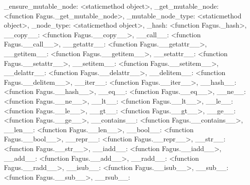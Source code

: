 \documentclass[a4paper,10pt,english]{sphinxmanual}
\begin{document}
\begin{fulllineitems}
\begin{fulllineitems}
\textquotesingle{}\_ensure\_mutable\_node\textquotesingle{}: \textless{}staticmethod object\textgreater{}, \textquotesingle{}\_get\_mutable\_node\textquotesingle{}: \textless{}function Fagus.\_get\_mutable\_node\textgreater{}, \textquotesingle{}\_mutable\_node\_type\textquotesingle{}: \textless{}staticmethod object\textgreater{}, \textquotesingle{}\_node\_type\textquotesingle{}: \textless{}staticmethod object\textgreater{}, \textquotesingle{}\_hash\textquotesingle{}: \textless{}function Fagus.\_hash\textgreater{}, \textquotesingle{}\_\_copy\_\_\textquotesingle{}: \textless{}function Fagus.\_\_copy\_\_\textgreater{}, \textquotesingle{}\_\_call\_\_\textquotesingle{}: \textless{}function Fagus.\_\_call\_\_\textgreater{}, \textquotesingle{}\_\_getattr\_\_\textquotesingle{}: \textless{}function Fagus.\_\_getattr\_\_\textgreater{}, \textquotesingle{}\_\_getitem\_\_\textquotesingle{}: \textless{}function Fagus.\_\_getitem\_\_\textgreater{}, \textquotesingle{}\_\_setattr\_\_\textquotesingle{}: \textless{}function Fagus.\_\_setattr\_\_\textgreater{}, \textquotesingle{}\_\_setitem\_\_\textquotesingle{}: \textless{}function Fagus.\_\_setitem\_\_\textgreater{}, \textquotesingle{}\_\_delattr\_\_\textquotesingle{}: \textless{}function Fagus.\_\_delattr\_\_\textgreater{}, \textquotesingle{}\_\_delitem\_\_\textquotesingle{}: \textless{}function Fagus.\_\_delitem\_\_\textgreater{}, \textquotesingle{}\_\_iter\_\_\textquotesingle{}: \textless{}function Fagus.\_\_iter\_\_\textgreater{}, \textquotesingle{}\_\_hash\_\_\textquotesingle{}: \textless{}function Fagus.\_\_hash\_\_\textgreater{}, \textquotesingle{}\_\_eq\_\_\textquotesingle{}: \textless{}function Fagus.\_\_eq\_\_\textgreater{}, \textquotesingle{}\_\_ne\_\_\textquotesingle{}: \textless{}function Fagus.\_\_ne\_\_\textgreater{}, \textquotesingle{}\_\_lt\_\_\textquotesingle{}: \textless{}function Fagus.\_\_lt\_\_\textgreater{}, \textquotesingle{}\_\_le\_\_\textquotesingle{}: \textless{}function Fagus.\_\_le\_\_\textgreater{}, \textquotesingle{}\_\_gt\_\_\textquotesingle{}: \textless{}function Fagus.\_\_gt\_\_\textgreater{}, \textquotesingle{}\_\_ge\_\_\textquotesingle{}: \textless{}function Fagus.\_\_ge\_\_\textgreater{}, \textquotesingle{}\_\_contains\_\_\textquotesingle{}: \textless{}function Fagus.\_\_contains\_\_\textgreater{}, \textquotesingle{}\_\_len\_\_\textquotesingle{}: \textless{}function Fagus.\_\_len\_\_\textgreater{}, \textquotesingle{}\_\_bool\_\_\textquotesingle{}: \textless{}function Fagus.\_\_bool\_\_\textgreater{}, \textquotesingle{}\_\_repr\_\_\textquotesingle{}: \textless{}function Fagus.\_\_repr\_\_\textgreater{}, \textquotesingle{}\_\_str\_\_\textquotesingle{}: \textless{}function Fagus.\_\_str\_\_\textgreater{}, \textquotesingle{}\_\_iadd\_\_\textquotesingle{}: \textless{}function Fagus.\_\_iadd\_\_\textgreater{}, \textquotesingle{}\_\_add\_\_\textquotesingle{}: \textless{}function Fagus.\_\_add\_\_\textgreater{}, \textquotesingle{}\_\_radd\_\_\textquotesingle{}: \textless{}function Fagus.\_\_radd\_\_\textgreater{}, \textquotesingle{}\_\_isub\_\_\textquotesingle{}: \textless{}function Fagus.\_\_isub\_\_\textgreater{}, \textquotesingle{}\_\_sub\_\_\textquotesingle{}: \textless{}function Fagus.\_\_sub\_\_\textgreater{}, \textquotesingle{}\_\_rsub\_\_\textquotesingle{}: 
\end{fulllineitems}
\end{fulllineitems}
\end{document}
